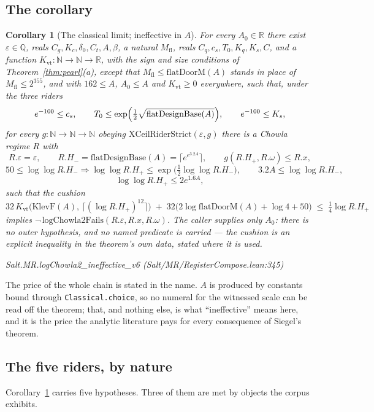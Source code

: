 \documentclass[11pt]{amsart}
\newcommand{\leanname}[1]{\par{\noindent\small\ttfamily\raggedright #1\par}}
\newtheorem{corollary}[theorem]{Corollary}
\theoremstyle{remark}
\begin{document}
\subsection{The corollary}
\begin{corollary}[The classical limit; ineffective in $A$]\label{cor:v6}
For every $A_0 \in \mathbb{R}$ there exist $\varepsilon \in \mathbb{Q}$, reals
$C_g, K_c, \delta_0, C_t, A, \beta$, a natural $M_{\mathrm{fl}}$, reals
$C_q, c_s, T_0, K_q, K_s, C$, and a function
$K_{\mathrm{vt}} : \mathbb{N}\to\mathbb{N}\to\mathbb{R}$, with the sign and
size conditions of Theorem~\ref{thm:pearl}(a), except that
$M_{\mathrm{fl}} \le \mathrm{flatDoorM}(A)$ stands in place of
$M_{\mathrm{fl}} \le 2^{355}$, and with $162 \le A$, $A_0 \le A$ and
$K_{\mathrm{vt}} \ge 0$ everywhere, such that, under the three riders
\[
e^{-100} \le c_s,
\qquad
T_0 \le \exp\Bigl(\tfrac12\sqrt{\mathrm{flatDesignBase}(A)}\Bigr),
\qquad
e^{-100} \le K_s ,
\]
for every $g : \mathbb{N}\to\mathbb{N}\to\mathbb{N}$ obeying
$\mathrm{XCeilRiderStrict}(\varepsilon, g)$ there is a Chowla regime $R$ with
\[
R.\varepsilon = \varepsilon, \qquad
R.H_- = \mathrm{flatDesignBase}(A) = \bigl\lceil e^{e^{3.2A}}\bigr\rceil,
\qquad g(R.H_+, R.\omega) \le R.x,
\]
\[
50 \le \log\log R.H_- \Rightarrow
\log\log R.H_+ \le \exp\bigl(\tfrac12\log\log R.H_-\bigr),
\qquad
3.2A \le \log\log R.H_-,
\]
\[
\log\log R.H_+ \le 2e^{1.6A},
\]
such that the cushion
\[
32\,K_{\mathrm{vt}}\bigl(\mathrm{KlevF}(A),\,
  \lceil (\log R.H_+)^{12}\rceil\bigr)
\;+\; 32\bigl(2\log \mathrm{flatDoorM}(A) + \log 4 + 50\bigr)
\;\le\; \tfrac{1}{4}\log R.H_+
\]
implies $\lnot\,\mathrm{logChowla2Fails}(R.\varepsilon, R.x, R.\omega)$.
The caller supplies only $A_0$: there is no outer hypothesis, and no named
predicate is carried --- the cushion is an explicit inequality in the theorem's
own data, stated where it is used.
\leanname{Salt.MR.logChowla2\_ineffective\_v6
(Salt/MR/RegisterCompose.lean:345)}
\end{corollary}

The price of the whole chain is stated in the name. $A$ is produced by
constants bound through \texttt{Classical.choice}, so no numeral for the
witnessed scale can be read off the theorem; that, and nothing else, is what
``ineffective'' means here, and it is the price the analytic literature pays
for every consequence of Siegel's theorem.

\subsection{The five riders, by nature}
Corollary~\ref{cor:v6} carries five hypotheses. Three of them are met by
objects the corpus exhibits.
\end{document}
